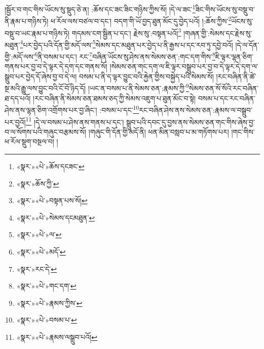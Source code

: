།སྦྱོར་བ་གང་གིས་ཡོངས་སུ་སྡུད་ཅེ་ན། :ཆོས་དང་ཟང་ཟིང་གཉིས་ཀྱིས་སོ། །དེ་ལ་ཟང་\footnote{«སྣར་»«པེ་»ཆོས་དངཟང་}ཟིང་གིས་ཡོངས་སུ་བསྡུ་བ་ནི་རྣམ་པ་གཉིས་ཏེ། ཕ་རོལ་ལས་བཙལ་བ་དང་། བདག་གི་ཡོ་བྱད་ཐུན་མོང་དུ་བྱེད་པའོ། །:ཆོས་ཀྱིས་\footnote{«སྣར་»ཆོས་ཀྱི་}ཡོངས་སུ་བསྡུ་བ་ཡང་རྣམ་པ་གཉིས་ཏེ། གདམས་ངག་སྦྱིན་པ་དང་། རྗེས་སུ་:བསྟན་པའོ།\footnote{«སྣར་»«པེ་»བསྟན་པས་སོ།} །གཞན་གྱི་:སེམས་དང་རྗེས་སུ་མཐུན་\footnote{«སྣར་»«པེ་»སེམས་དངམཐུན་}པར་བྱེད་པའི་དོན་གྱི་མདོ་ལས་\footnote{«སྣར་»«པེ་»ལ་}སེམས་དང་མཐུན་པར་བྱེད་པ་ནི་རྒྱས་པ་དང་རབ་ཏུ་དབྱེ་བའོ། །དེ་ལ་དོན་གྱི་:མདོ་ལས་\footnote{«སྣར་»«པེ་»མདོ་}ནི་བསམ་པ་དང་། རང་\footnote{«སྣར་»རང་དེ་}བཞིན་ཡོངས་སུ་ཤེས་ནས་སེམས་ཅན་:གང་དག་གིས་\footnote{«སྣར་»«པེ་»གང་དག་}ཇི་ལྟར་ལྷན་ཅིག་གནས་པར་བྱ་བ་དེ་ལྟར་དེ་དག་དང་གནས་སོ། །སེམས་ཅན་གང་དག་ལ་ཇི་ལྟར་བསྒྲུབ་པར་བྱ་བ་དེ་ལྟར་དེ་དག་ལ་སྒྲུབ་པར་བྱེད་དོ་ཞེས་བྱ་བ་དེ་ལ། བསམ་པ་ནི་ད་ལྟར་བྱུང་བའི་རྐྱེན་གྱིས་བསྐྱེད་པའི་སེམས་སོ། །རང་བཞིན་ནི་ཚེ་སྔ་མའི་རྒྱུ་ལས་བྱུང་བའི་ངོ་བོ་ཉིད་དོ། །ཡང་ན་བསམ་པ་ནི་སེམས་ཅན་:རྣམས་ཀྱི་\footnote{«སྣར་»«པེ་»རྣམས་ཀྱིས་}སེམས་ཅན་སོ་སོའི་རང་བཞིན་ཐ་དད་པའོ། །རང་བཞིན་ནི་སེམས་ཅན་ཐམས་ཅད་ཀྱི་སེམས་འཇུག་པ་ཐུན་མོང་བ་སྟེ། བསམ་པ་དང་རང་བཞིན་ཤེས་ནས་ལྷན་ཅིག་འགྲོགས་པར་བྱ་ཞིང་། :བསམ་པ་དང་\footnote{«སྣར་»«པེ་»བསམ་པ་}རང་བཞིན་ཤེས་ནས་སེམས་ཅན་:རྣམས་ལ་བསྒྲུབ་པར་བྱའོ།\footnote{«སྣར་»«པེ་»རྣམས་ལསྒྲུབ་པའོ།} །དེ་ལ་བསམ་པ་ཤེས་ནས་གནས་པ་དང་། སྒྲུབ་པའི་དབང་དུ་བྱས་ནས་སེམས་ཅན་གང་གིས་ཞེས་བྱ་བ་ལ་སོགས་པའི་གཞུང་བརྩམས་སོ། །གཞུང་གི་དོན་གྱི་མདོ་ནི། ཕན་མིན་བསླབ་པ་མ་གཏོགས་པར། །གང་གིས་ཕ་རོལ་སྡུག་བསྔལ་བ། །
